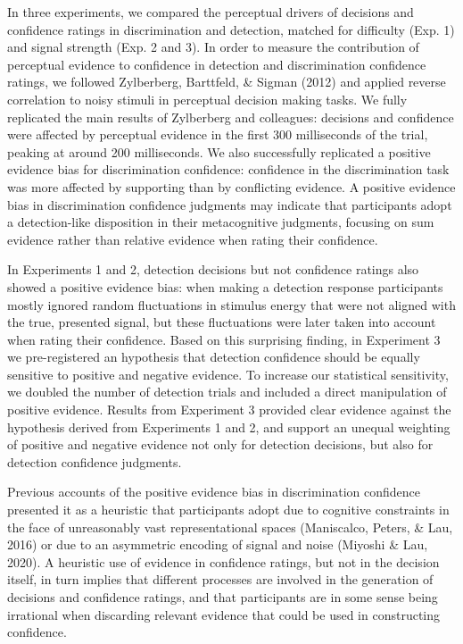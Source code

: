 \documentclass[12pt,twoside]{reedthesis}
\begin{document}
In three experiments, we compared the perceptual drivers of decisions and confidence ratings in discrimination and detection, matched for difficulty (Exp. 1) and signal strength (Exp. 2 and 3). In order to measure the contribution of perceptual evidence to confidence in detection and discrimination confidence ratings, we followed Zylberberg, Barttfeld, \& Sigman (2012) and applied reverse correlation to noisy stimuli in perceptual decision making tasks. We fully replicated the main results of Zylberberg and colleagues: decisions and confidence were affected by perceptual evidence in the first 300 milliseconds of the trial, peaking at around 200 milliseconds. We also successfully replicated a positive evidence bias for discrimination confidence: confidence in the discrimination task was more affected by supporting than by conflicting evidence. A positive evidence bias in discrimination confidence judgments may indicate that participants adopt a detection-like disposition in their metacognitive judgments, focusing on sum evidence rather than relative evidence when rating their confidence.

In Experiments 1 and 2, detection decisions but not confidence ratings also showed a positive evidence bias: when making a detection response participants mostly ignored random fluctuations in stimulus energy that were not aligned with the true, presented signal, but these fluctuations were later taken into account when rating their confidence. Based on this surprising finding, in Experiment 3 we pre-registered an hypothesis that detection confidence should be equally sensitive to positive and negative evidence. To increase our statistical sensitivity, we doubled the number of detection trials and included a direct manipulation of positive evidence. Results from Experiment 3 provided clear evidence against the hypothesis derived from Experiments 1 and 2, and support an unequal weighting of positive and negative evidence not only for detection decisions, but also for detection confidence judgments.

Previous accounts of the positive evidence bias in discrimination confidence presented it as a heuristic that participants adopt due to cognitive constraints in the face of unreasonably vast representational spaces (Maniscalco, Peters, \& Lau, 2016) or due to an asymmetric encoding of signal and noise (Miyoshi \& Lau, 2020). A heuristic use of evidence in confidence ratings, but not in the decision itself, in turn implies that different processes are involved in the generation of decisions and confidence ratings, and that participants are in some sense being irrational when discarding relevant evidence that could be used in constructing confidence.
\end{document}
